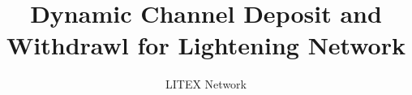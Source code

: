 \documentclass[10pt]{article}
\begin{document}
\title{\huge Dynamic Channel Deposit and Withdrawl for Lightening Network}
\date{}
\author{LITEX Network}
\maketitle


%













\end{document}
